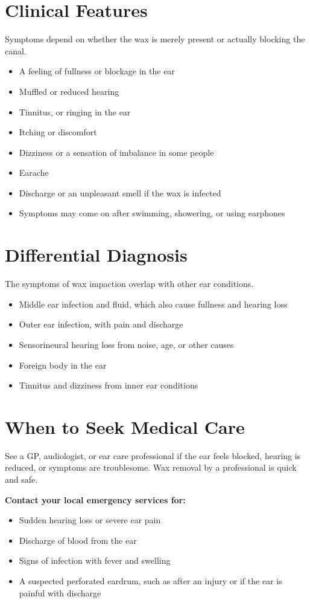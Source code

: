 \section*{Clinical Features}
Symptoms depend on whether the wax is merely present or actually blocking the canal.
\begin{itemize}
    \item A feeling of fullness or blockage in the ear
    \item Muffled or reduced hearing
    \item Tinnitus, or ringing in the ear
    \item Itching or discomfort
    \item Dizziness or a sensation of imbalance in some people
    \item Earache
    \item Discharge or an unpleasant smell if the wax is infected
    \item Symptoms may come on after swimming, showering, or using earphones
\end{itemize}

\section*{Differential Diagnosis}
The symptoms of wax impaction overlap with other ear conditions.
\begin{itemize}
    \item Middle ear infection and fluid, which also cause fullness and hearing loss
    \item Outer ear infection, with pain and discharge
    \item Sensorineural hearing loss from noise, age, or other causes
    \item Foreign body in the ear
    \item Tinnitus and dizziness from inner ear conditions
\end{itemize}

\section*{When to Seek Medical Care}
See a GP, audiologist, or ear care professional if the ear feels blocked, hearing is reduced, or symptoms are troublesome. Wax removal by a professional is quick and safe.

\textbf{Contact your local emergency services for:}
\begin{itemize}
    \item Sudden hearing loss or severe ear pain
    \item Discharge of blood from the ear
    \item Signs of infection with fever and swelling
    \item A suspected perforated eardrum, such as after an injury or if the ear is painful with discharge
\end{itemize}

